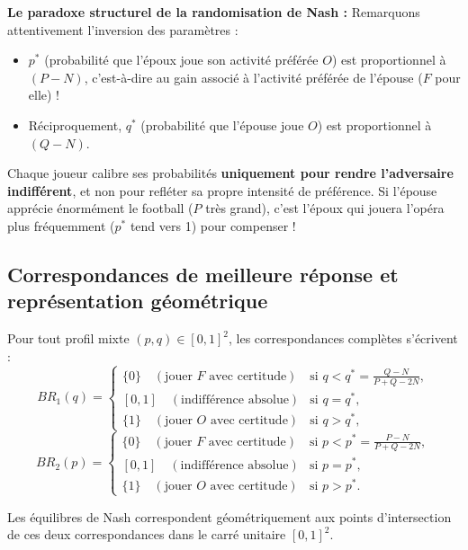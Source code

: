 \documentclass[11pt,a4paper]{article}
\begin{document}
\begin{piegebox}
\textbf{Le paradoxe structurel de la randomisation de Nash :}
Remarquons attentivement l'inversion des paramètres :
\begin{itemize}[leftmargin=1.5em]
    \item $p^*$ (probabilité que l'époux joue son activité préférée $O$) est proportionnel à $(P - N)$, c'est-à-dire au gain associé à l'activité préférée de l'épouse ($F$ pour elle) !
    \item Réciproquement, $q^*$ (probabilité que l'épouse joue $O$) est proportionnel à $(Q - N)$.
\end{itemize}
Chaque joueur calibre ses probabilités \textbf{uniquement pour rendre l'adversaire indifférent}, et non pour refléter sa propre intensité de préférence. Si l'épouse apprécie énormément le football ($P$ très grand), c'est l'époux qui jouera l'opéra plus fréquemment ($p^*$ tend vers 1) pour compenser !
\end{piegebox}

\subsection{Correspondances de meilleure réponse et représentation géométrique}
Pour tout profil mixte $(p, q) \in [0, 1]^2$, les correspondances complètes s'écrivent :
\begin{equation}
BR_1(q) = \begin{cases}
\{0\} \quad (\text{jouer } F \text{ avec certitude}) & \text{si } q < q^* = \frac{Q-N}{P+Q-2N}, \\
[0, 1] \quad (\text{indifférence absolue}) & \text{si } q = q^*, \\
\{1\} \quad (\text{jouer } O \text{ avec certitude}) & \text{si } q > q^*,
\end{cases}
\end{equation}
\begin{equation}
BR_2(p) = \begin{cases}
\{0\} \quad (\text{jouer } F \text{ avec certitude}) & \text{si } p < p^* = \frac{P-N}{P+Q-2N}, \\
[0, 1] \quad (\text{indifférence absolue}) & \text{si } p = p^*, \\
\{1\} \quad (\text{jouer } O \text{ avec certitude}) & \text{si } p > p^*.
\end{cases}
\end{equation}

Les équilibres de Nash correspondent géométriquement aux points d'intersection de ces deux correspondances dans le carré unitaire $[0, 1]^2$.
\end{document}
